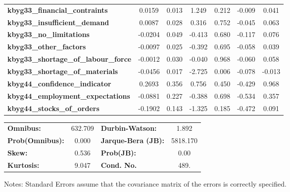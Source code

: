 \begin{center}
\begin{tabular}{lcccccc}
\textbf{kbyg33\_financial\_contraints}       &       0.0159  &        0.013     &     1.249  &         0.212        &       -0.009    &        0.041     \\
\textbf{kbyg33\_insufficient\_demand}        &       0.0087  &        0.028     &     0.316  &         0.752        &       -0.045    &        0.063     \\
\textbf{kbyg33\_no\_limitations}             &      -0.0204  &        0.049     &    -0.413  &         0.680        &       -0.117    &        0.076     \\
\textbf{kbyg33\_other\_factors}              &      -0.0097  &        0.025     &    -0.392  &         0.695        &       -0.058    &        0.039     \\
\textbf{kbyg33\_shortage\_of\_labour\_force} &      -0.0012  &        0.030     &    -0.040  &         0.968        &       -0.060    &        0.058     \\
\textbf{kbyg33\_shortage\_of\_materials}     &      -0.0456  &        0.017     &    -2.725  &         0.006        &       -0.078    &       -0.013     \\
\textbf{kbyg44\_confidence\_indicator}       &       0.2693  &        0.356     &     0.756  &         0.450        &       -0.429    &        0.968     \\
\textbf{kbyg44\_employment\_expectations}    &      -0.0881  &        0.227     &    -0.388  &         0.698        &       -0.534    &        0.357     \\
\textbf{kbyg44\_stocks\_of\_orders}          &      -0.1902  &        0.143     &    -1.325  &         0.185        &       -0.472    &        0.091     \\
\bottomrule
\end{tabular}
\begin{tabular}{lclc}
\textbf{Omnibus:}       & 632.709 & \textbf{  Durbin-Watson:     } &    1.892  \\
\textbf{Prob(Omnibus):} &   0.000 & \textbf{  Jarque-Bera (JB):  } & 5818.170  \\
\textbf{Skew:}          &   0.536 & \textbf{  Prob(JB):          } &     0.00  \\
\textbf{Kurtosis:}      &   9.047 & \textbf{  Cond. No.          } &     489.  \\
\bottomrule
\end{tabular}
\end{center}

Notes: \newline
 [1] Standard Errors assume that the covariance matrix of the errors is correctly specified.